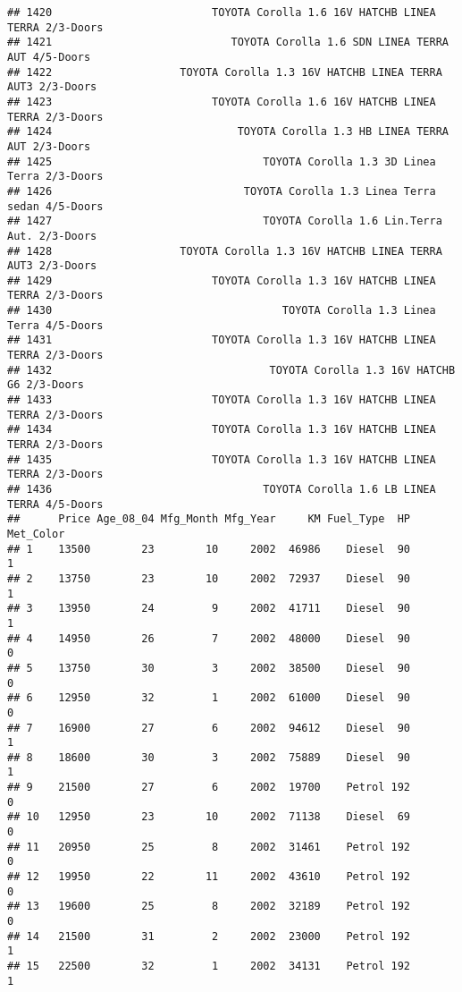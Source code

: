 \documentclass[]{article}
\begin{document}
\begin{verbatim}
## 1420                         TOYOTA Corolla 1.6 16V HATCHB LINEA TERRA 2/3-Doors
## 1421                            TOYOTA Corolla 1.6 SDN LINEA TERRA AUT 4/5-Doors
## 1422                    TOYOTA Corolla 1.3 16V HATCHB LINEA TERRA AUT3 2/3-Doors
## 1423                         TOYOTA Corolla 1.6 16V HATCHB LINEA TERRA 2/3-Doors
## 1424                             TOYOTA Corolla 1.3 HB LINEA TERRA AUT 2/3-Doors
## 1425                                 TOYOTA Corolla 1.3 3D Linea Terra 2/3-Doors
## 1426                              TOYOTA Corolla 1.3 Linea Terra sedan 4/5-Doors
## 1427                                 TOYOTA Corolla 1.6 Lin.Terra Aut. 2/3-Doors
## 1428                    TOYOTA Corolla 1.3 16V HATCHB LINEA TERRA AUT3 2/3-Doors
## 1429                         TOYOTA Corolla 1.3 16V HATCHB LINEA TERRA 2/3-Doors
## 1430                                    TOYOTA Corolla 1.3 Linea Terra 4/5-Doors
## 1431                         TOYOTA Corolla 1.3 16V HATCHB LINEA TERRA 2/3-Doors
## 1432                                  TOYOTA Corolla 1.3 16V HATCHB G6 2/3-Doors
## 1433                         TOYOTA Corolla 1.3 16V HATCHB LINEA TERRA 2/3-Doors
## 1434                         TOYOTA Corolla 1.3 16V HATCHB LINEA TERRA 2/3-Doors
## 1435                         TOYOTA Corolla 1.3 16V HATCHB LINEA TERRA 2/3-Doors
## 1436                                 TOYOTA Corolla 1.6 LB LINEA TERRA 4/5-Doors
##      Price Age_08_04 Mfg_Month Mfg_Year     KM Fuel_Type  HP Met_Color
## 1    13500        23        10     2002  46986    Diesel  90         1
## 2    13750        23        10     2002  72937    Diesel  90         1
## 3    13950        24         9     2002  41711    Diesel  90         1
## 4    14950        26         7     2002  48000    Diesel  90         0
## 5    13750        30         3     2002  38500    Diesel  90         0
## 6    12950        32         1     2002  61000    Diesel  90         0
## 7    16900        27         6     2002  94612    Diesel  90         1
## 8    18600        30         3     2002  75889    Diesel  90         1
## 9    21500        27         6     2002  19700    Petrol 192         0
## 10   12950        23        10     2002  71138    Diesel  69         0
## 11   20950        25         8     2002  31461    Petrol 192         0
## 12   19950        22        11     2002  43610    Petrol 192         0
## 13   19600        25         8     2002  32189    Petrol 192         0
## 14   21500        31         2     2002  23000    Petrol 192         1
## 15   22500        32         1     2002  34131    Petrol 192         1

\end{verbatim}
\end{document}
